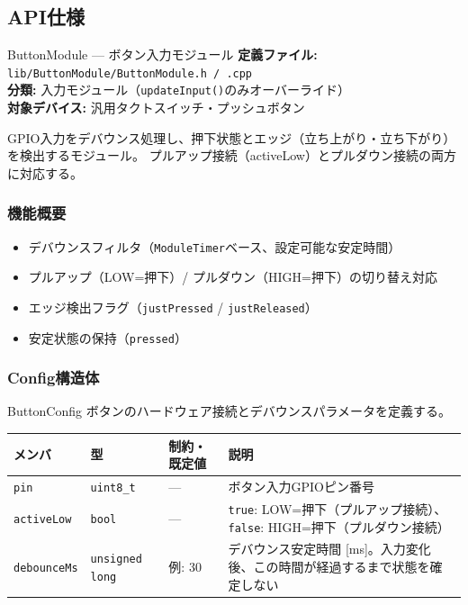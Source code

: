 \subsection{API仕様}


\begin{apibox}{ButtonModule --- ボタン入力モジュール}
\textbf{定義ファイル:} \texttt{lib/ButtonModule/ButtonModule.h / .cpp}\\
\textbf{分類:} 入力モジュール（\texttt{updateInput()}のみオーバーライド）\\
\textbf{対象デバイス:} 汎用タクトスイッチ・プッシュボタン

GPIO入力をデバウンス処理し、押下状態とエッジ（立ち上がり・立ち下がり）を検出するモジュール。
プルアップ接続（activeLow）とプルダウン接続の両方に対応する。
\end{apibox}

\subsubsection{機能概要}

\begin{itemize}
    \item デバウンスフィルタ（\texttt{ModuleTimer}ベース、設定可能な安定時間）
    \item プルアップ（LOW=押下）/ プルダウン（HIGH=押下）の切り替え対応
    \item エッジ検出フラグ（\texttt{justPressed} / \texttt{justReleased}）
    \item 安定状態の保持（\texttt{pressed}）
\end{itemize}

\subsubsection{Config構造体}

\begin{funcblock}{ButtonConfig}
ボタンのハードウェア接続とデバウンスパラメータを定義する。

\begin{longtable}{l l l p{5.2cm}}
\toprule
\textbf{メンバ} & \textbf{型} & \textbf{制約・既定値} & \textbf{説明} \\
\midrule
\endhead
\texttt{pin}        & \texttt{uint8\_t}       & ---          & ボタン入力GPIOピン番号 \\
\texttt{activeLow}  & \texttt{bool}           & ---          & \texttt{true}: LOW=押下（プルアップ接続）、\texttt{false}: HIGH=押下（プルダウン接続） \\
\texttt{debounceMs} & \texttt{unsigned long}  & 例: 30       & デバウンス安定時間 [ms]。入力変化後、この時間が経過するまで状態を確定しない \\
\bottomrule
\end{longtable}
\end{funcblock}

